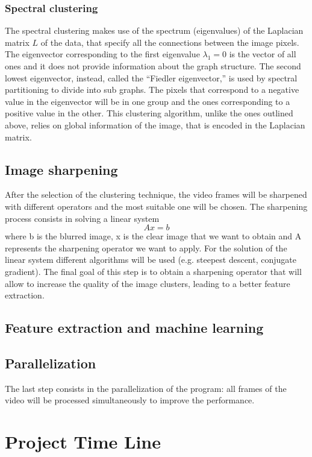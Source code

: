 \documentclass[11pt]{article}
\begin{document}
\subsubsection{Spectral clustering}
The spectral clustering makes use of the spectrum (eigenvalues) of the Laplacian matrix $L$ of the data, that specify all the connections between the image pixels.
The eigenvector corresponding to the first eigenvalue $\lambda_1=0$ is the vector of all ones and it does not provide information about the graph structure. The second lowest eigenvector, instead, called the ``Fiedler eigenvector,'' is used by spectral partitioning to divide into sub graphs. The pixels that correspond to a negative value in the eigenvector will be in one group and the ones corresponding to a positive value in the other. This clustering algorithm, unlike the ones outlined above, relies on global information of the image, that is encoded in the Laplacian matrix.


\subsection{Image sharpening}
After the selection of the clustering technique, the video frames will be sharpened with different operators and the most suitable one will be chosen. The sharpening process consists in solving a linear system
$$Ax=b$$
where b is the blurred image, x is the clear image that we want to obtain and A represents the sharpening operator we want to apply. For the solution of the linear system different algorithms will be used (e.g. steepest descent, conjugate gradient).
The final goal of this step is to obtain a sharpening operator that will allow to increase the quality of the image clusters, leading to a better feature extraction. 
\subsection{Feature extraction and machine learning}


\subsection{Parallelization}
The last step consists in the parallelization of the program: all frames of the video will be processed simultaneously to improve the performance.


\section{Project Time Line}
\end{document}
